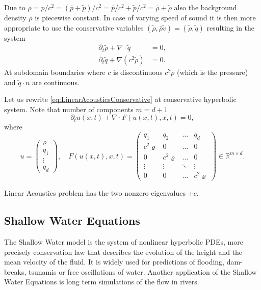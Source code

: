 \documentclass[a4paper,12pt]{article}
\theoremstyle{definition}
\theoremstyle{definition}
\newcommand{\Dim}{d}
\begin{document}
Due to $\rho = p/c^2 = (\bar{p} + \tilde{p})/c^2 = \bar{p}/c^2 +\tilde{p}/c^2 = \bar\rho + \tilde\rho$
also the background density $\bar\rho$ is piecewise constant. In case of varying speed of sound
it is then more appropriate to use the conservative variables $(\tilde\rho, \bar{\rho} \tilde{v}) = (\tilde\rho,\tilde{q})$
resulting in the system
\begin{subequations}\label{eq:LinearAcousticsConservative}
	\begin{align}
	\partial_t \tilde{\rho} +  \nabla\cdot\tilde{q} &= 0,\\
	\partial_t \tilde{q} + \nabla (c^2\tilde{\rho}) &= 0.
	\end{align}
\end{subequations}
At subdomain boundaries where $c$ is discontinuous $c^2\tilde\rho$
(which is the pressure) and $\tilde{q}\cdot n$ are continuous.

Let us rewrite \eqref{eq:LinearAcousticsConservative} at conservative hyperbolic system. Note that number of components $m=\Dim+1$
$$\partial_t u(x,t) + \nabla\cdot F(u(x,t),x,t) = 0,$$
where
$$u = \begin{pmatrix}
\varrho\\
q_1\\
\vdots\\
q_\Dim
\end{pmatrix} ,\quad
F(u(x,t),x,t) = \left( \begin{matrix}
q_1  & q_2 & \dots & q_{\Dim}\\
c^2\varrho & 0 & \dots & 0\\
0 & c^2\varrho & \dots & 0\\
\vdots & \vdots & \ddots & \vdots\\
0 & 0 & \dots & c^2\varrho
\end{matrix} \right)\in \mathbb{R}^{m\times \Dim} .$$

Linear Acoustics problem has the two nonzero eigenvalues $\pm c$.


\subsection{Shallow Water Equations}
The Shallow Water model is the system of nonlinear hyperbolic PDEs, more precisely conservation law that describes the evolution of the height and the mean velocity of the fluid. It is widely used for predictions of flooding, dam-breaks, tsunamis or free oscillations of water. Another application of the Shallow Water Equations is long term simulations of the flow in rivers.
\end{document}
